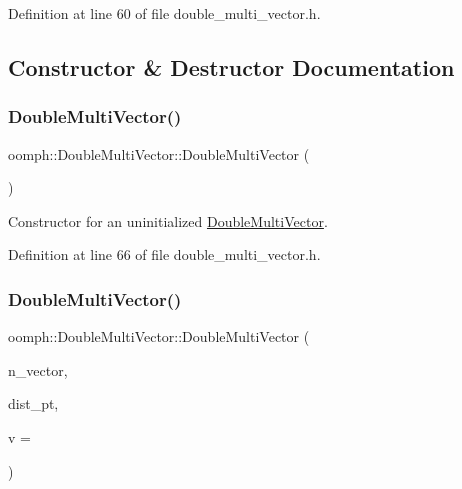 Definition at line 60 of file double\+\_\+multi\+\_\+vector.\+h.



\subsection{Constructor \& Destructor Documentation}
\mbox{\label{classoomph_1_1DoubleMultiVector_a3949a54e110bb672981bf4b9d353f2d2}} 
\subsubsection{\texorpdfstring{Double\+Multi\+Vector()}{DoubleMultiVector()}\hspace{0.1cm}{\footnotesize\ttfamily [1/7]}}
{\footnotesize\ttfamily oomph\+::\+Double\+Multi\+Vector\+::\+Double\+Multi\+Vector (\begin{DoxyParamCaption}{ }\end{DoxyParamCaption})\hspace{0.3cm}{\ttfamily [inline]}}



Constructor for an uninitialized \hyperlink{classoomph_1_1DoubleMultiVector}{Double\+Multi\+Vector}. 



Definition at line 66 of file double\+\_\+multi\+\_\+vector.\+h.

\mbox{\label{classoomph_1_1DoubleMultiVector_a1a24f514e2589235589de6edadf5c058}} 
\subsubsection{\texorpdfstring{Double\+Multi\+Vector()}{DoubleMultiVector()}\hspace{0.1cm}{\footnotesize\ttfamily [2/7]}}
{\footnotesize\ttfamily oomph\+::\+Double\+Multi\+Vector\+::\+Double\+Multi\+Vector (\begin{DoxyParamCaption}\item[{const unsigned \&}]{n\+\_\+vector,  }\item[{const \hyperlink{classoomph_1_1LinearAlgebraDistribution}{Linear\+Algebra\+Distribution} $\ast$const \&}]{dist\+\_\+pt,  }\item[{const double \&}]{v = {} }\end{DoxyParamCaption})\hspace{0.3cm}{\ttfamily [inline]}}



